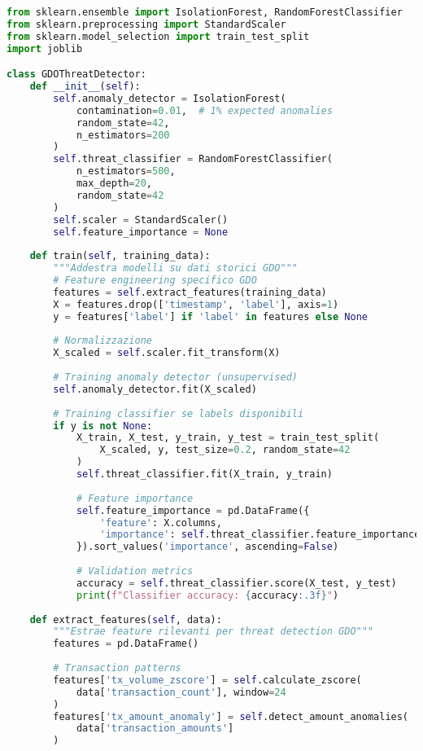 \begin{lstlisting}[language=Python, caption=ML Pipeline per Threat Detection GDO]
from sklearn.ensemble import IsolationForest, RandomForestClassifier
from sklearn.preprocessing import StandardScaler
from sklearn.model_selection import train_test_split
import joblib

class GDOThreatDetector:
    def __init__(self):
        self.anomaly_detector = IsolationForest(
            contamination=0.01,  # 1% expected anomalies
            random_state=42,
            n_estimators=200
        )
        self.threat_classifier = RandomForestClassifier(
            n_estimators=500,
            max_depth=20,
            random_state=42
        )
        self.scaler = StandardScaler()
        self.feature_importance = None
        
    def train(self, training_data):
        """Addestra modelli su dati storici GDO"""
        # Feature engineering specifico GDO
        features = self.extract_features(training_data)
        X = features.drop(['timestamp', 'label'], axis=1)
        y = features['label'] if 'label' in features else None
        
        # Normalizzazione
        X_scaled = self.scaler.fit_transform(X)
        
        # Training anomaly detector (unsupervised)
        self.anomaly_detector.fit(X_scaled)
        
        # Training classifier se labels disponibili
        if y is not None:
            X_train, X_test, y_train, y_test = train_test_split(
                X_scaled, y, test_size=0.2, random_state=42
            )
            self.threat_classifier.fit(X_train, y_train)
            
            # Feature importance
            self.feature_importance = pd.DataFrame({
                'feature': X.columns,
                'importance': self.threat_classifier.feature_importances_
            }).sort_values('importance', ascending=False)
            
            # Validation metrics
            accuracy = self.threat_classifier.score(X_test, y_test)
            print(f"Classifier accuracy: {accuracy:.3f}")
    
    def extract_features(self, data):
        """Estrae feature rilevanti per threat detection GDO"""
        features = pd.DataFrame()
        
        # Transaction patterns
        features['tx_volume_zscore'] = self.calculate_zscore(
            data['transaction_count'], window=24
        )
        features['tx_amount_anomaly'] = self.detect_amount_anomalies(
            data['transaction_amounts']
        )
        

\end{lstlisting}
